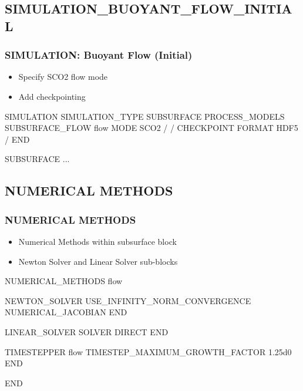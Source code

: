 \documentclass{beamer}
\begin{document}
\subsection{SIMULATION\_BUOYANT\_FLOW\_INITIAL}

\begin{frame}[fragile]\frametitle{SIMULATION: Buoyant Flow (Initial)}

\begin{itemize}
\item Specify SCO2 flow mode
\item Add checkpointing
\end{itemize}


\begin{semiverbatim}
SIMULATION
  SIMULATION_TYPE SUBSURFACE
  PROCESS_MODELS
    SUBSURFACE_FLOW flow
      MODE SCO2
    /
  /
CHECKPOINT
  FORMAT HDF5
/
END

SUBSURFACE
...

\end{semiverbatim}

\end{frame}

\subsection{NUMERICAL METHODS}
\begin{frame}[fragile]\frametitle{NUMERICAL METHODS}

\begin{itemize}
  \item Numerical Methods within subsurface block
  \item Newton Solver and Linear Solver sub-blocks
\end{itemize}

\begin{semiverbatim}
NUMERICAL_METHODS flow

  NEWTON_SOLVER
    USE_INFINITY_NORM_CONVERGENCE
    NUMERICAL_JACOBIAN
  END

  LINEAR_SOLVER
    SOLVER DIRECT
  END

  TIMESTEPPER flow
    TIMESTEP_MAXIMUM_GROWTH_FACTOR 1.25d0
  END

END

\end{semiverbatim}
\end{frame}
\end{document}
